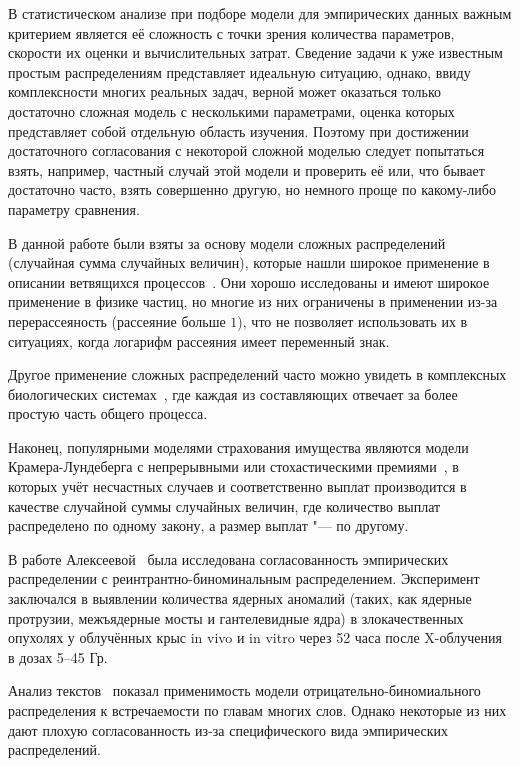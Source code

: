 \documentclass[12pt, specialist, subf, substylefile = spbu.rtx]{disser}
\begin{document}
	\intro
	
	В статистическом анализе при подборе модели для эмпирических данных важным критерием является её сложность с точки зрения количества параметров, скорости их оценки и вычислительных затрат. Сведение задачи к уже известным простым распределениям представляет идеальную ситуацию, однако, ввиду комплексности многих реальных задач, верной может оказаться только достаточно сложная модель с несколькими параметрами, оценка которых представляет собой отдельную область изучения. Поэтому при достижении достаточного согласования с некоторой сложной моделью следует попытаться взять, например, частный случай этой модели и проверить её или, что бывает достаточно часто, взять совершенно другую, но немного проще по какому-либо параметру сравнения.
	
	В данной работе были взяты за основу модели сложных распределений (случайная сумма случайных величин), которые нашли широкое применение в описании ветвящихся процессов~\cite{bib:vatutin2008}. Они хорошо исследованы и имеют широкое применение в физике частиц, но многие из них ограничены в применении из-за перерассеяность (рассеяние больше $ 1 $), что не позволяет использовать их в ситуациях, когда логарифм рассеяния имеет переменный знак.
	
	Другое применение сложных распределений часто можно увидеть в комплексных биологических системах~\cite{bib:alexeeva2013}, где каждая из составляющих отвечает за более простую часть общего процесса.
	
	Наконец, популярными моделями страхования имущества являются модели Крамера-Лундеберга с непрерывными или стохастическими премиями~\cite{bib:boykov2002}, в которых учёт несчастных случаев и соответственно выплат производится в качестве случайной суммы случайных величин, где количество выплат распределено по одному закону, а размер выплат "--- по другому.
	
	В работе Алексеевой~\cite{bib:alexeeva2008} была исследована согласованность эмпирических распределении с реинтрантно-биноминаль\-ным распределением. Эксперимент заключался в выявлении количества ядерных аномалий (таких, как ядерные протрузии, межъядерные мосты и гантелевидные ядра) в злокачественных опухолях у облучённых крыс in vivo и in vitro через 52 часа после X-облучения в дозах 5--45 Гр.
	
	Анализ текстов~\cite{bib:alexeevaeng2013} показал применимость модели отрицательно-биномиального распределения к встречаемости по главам многих слов. Однако некоторые из них дают плохую согласованность из-за специфического вида эмпирических распределений. 
	
\end{document}
